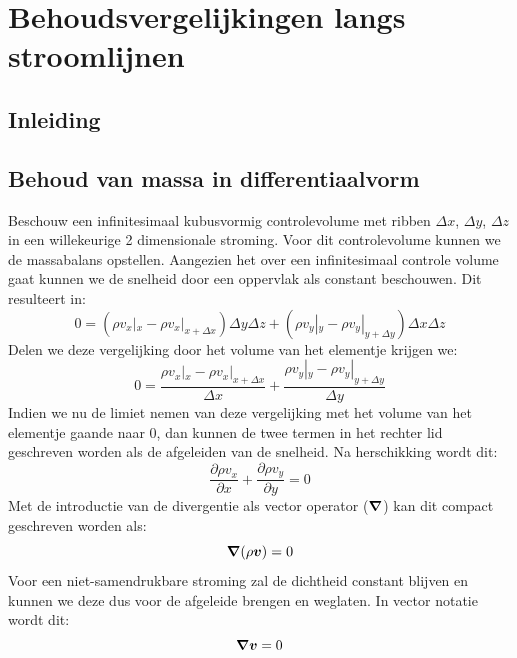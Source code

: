 \chapter{Behoudsvergelijkingen langs stroomlijnen}
\label{sec:Behoudsvergelijkingen langs stroomlijnen}

	\section{Inleiding}
	\label{sec:Behoudsvergelijkingen langs stroomlijnen inleiding}

	\section{Behoud van massa in differentiaalvorm}
	\label{sec:Behoud van massa in differentiaalvorm}
Beschouw een infinitesimaal kubusvormig controlevolume met ribben $\Delta x$, $\Delta y$, $\Delta z$ in een willekeurige 2 dimensionale stroming. Voor dit controlevolume kunnen we de massabalans opstellen. Aangezien het over een infinitesimaal controle volume gaat kunnen we de snelheid door een oppervlak als constant beschouwen. Dit resulteert in:
\begin{equation}
	0 = (\rho v_x|_{x} - \rho v_x|_{x+\Delta x})\Delta y \Delta z + (\rho v_y|_{y} - \rho v_y|_{y+\Delta y})\Delta x \Delta z
\end{equation}
Delen we deze vergelijking door het volume van het elementje krijgen we:
\begin{equation}
	0 = \frac{\rho v_x|_{x} - \rho v_x|_{x+\Delta x}}{\Delta x} + \frac{\rho v_y|_{y} - \rho v_y|_{y+\Delta y}}{\Delta y}
\end{equation}
Indien we nu de limiet nemen van deze vergelijking met het volume van het elementje gaande naar 0, dan kunnen de twee termen in het rechter lid geschreven worden als de afgeleiden van de snelheid. Na herschikking wordt dit:
\begin{equation}
	\frac{\partial \rho v_x}{\partial x} + \frac{\partial \rho v_y}{\partial y} = 0
	\label{eqn:continuiteitsvergelijking}
\end{equation}
Met de introductie van de divergentie als vector operator ($\boldsymbol{\nabla}$) kan dit compact geschreven worden als:
\begin{equation}
	\boldsymbol{\nabla} (\rho\boldsymbol{v}) = 0
\end{equation}
Voor een niet-samendrukbare stroming zal de dichtheid constant blijven en kunnen we deze dus voor de afgeleide brengen en weglaten. In vector notatie wordt dit:
 \begin{equation}
	\boldsymbol{\nabla} \boldsymbol{v} = 0
\end{equation}

